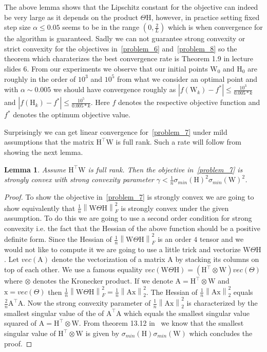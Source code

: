 \documentclass{article}
\newcommand{\0}{\mathrm{0}}
\newcommand{\1}{\mathrm{1}}
\newcommand{\A}{\mathrm{A}}
\renewcommand{\H}{\mathrm{H}}
\newcommand{\W}{\mathrm{W}}
\newcommand{\x}{\mathrm{x}}
\newcommand{\norm}[1]{\left\| #1 \right\|}
\newtheorem{lemma}[theorem]{Lemma}
\begin{document}
The above lemma shows that the Lipschitz constant for the objective can indeed be very large as it depends on the product $\Theta\H$, however, in practice setting fixed step size $\alpha \leq 0.05$ seems to be in the range $(0,\frac{2}{L})$ which is when convergence for the algorithm is guaranteed. Sadly we can not guarantee strong convexity or strict convexity for the objectives in~\ref{problem_6} and~\ref{problem_8} so the theorem which charaterizes the best convergence rate is Theorem 1.9 in lecture slides 6. From our experiments we observe that our initial points $\W_0$ and $\H_0$ are roughly in the order of $10^3$ and $10^5$ from what we consider an optimal point and with $\alpha\sim 0.005$ we should have convergence roughly as $|f(\W_k) - f^*| \leq \frac{10^3}{0.005*k}$ and $|f(\H_k) - f^*| \leq \frac{10^5}{0.005*k}$. Here $f$ denotes the respective objective function and $f^*$ denotes the optimum objective value.
\par
Surprisingly we can get linear convergence for~\ref{problem_7} under mild assumptions that the matrix $\H^\top \W$ is full rank. Such a rate will follow from showing the next lemma.
\begin{lemma}
  Assume $\H^\top \W$ is full rank. Then the objective in~\ref{problem_7} is strongly convex with strong convexity parameter $\gamma < \frac{1}{n}\sigma_{min}(\H)^2\sigma_{min}(\W)^2$.
\end{lemma}
\begin{proof}
To show the objective in~\ref{problem_7} is strongly convex we are going to show equivalently that $\frac{1}{n}\norm{\W\Theta\H}_F^2$ is strongly convex under the given assumption. To do this we are going to use a second order condition for strong convexity i.e. the fact that the Hessian of the above function should be a positive definite form. Since the Hessian of $\frac{1}{n}\norm{\W\Theta\H}_F^2$ is an order $4$ tensor and we would not like to compute it we are going to use a little trick and vectorize $\W\Theta\H$. Let $vec(\A)$ denote the vectorization of a matrix $\A$ by stacking its columns on top of each other. We use a famous equality $vec\left(\W\Theta\H\right) = \left(\H^\top\otimes\W\right)vec(\Theta)$ where $\otimes$ denotes the Kronecker product. If we denote $\A = \H^\top\otimes\W$ and $\x = vec(\Theta)$ then $\frac{1}{n}\norm{\W\Theta\H}_F^2 = \frac{1}{n}\norm{\A\x}_2^2$. The Hessian of $\frac{1}{n}\norm{\A\x}_2^2$ equals $\frac{2}{n}\A^\top\A$. Now the strong convexity parameter of $\frac{1}{n}\norm{\A\x}_2^2$ is characterized by the smallest singular value of the of $\A^\top\A$ which equals the smallest singular value squared of $\A=\H^\top\otimes\W$. From theorem 13.12 in~\cite{laub2005matrix} we know that the smallest singular value of $\H^\top\otimes\W$ is given by $\sigma_{min}(\H)\sigma_{min}(\W)$ which concludes the proof.
\end{proof}
\end{document}
